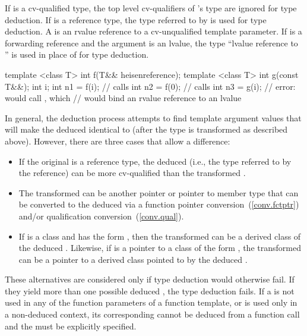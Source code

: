 \pnum
{}%
If
is a cv-qualified type, the top level cv-qualifiers of
's
type are ignored for type deduction.
If
is a reference type, the type
referred to by
is used for type deduction.
A 
is an rvalue reference to a cv-unqualified template parameter.
If  is a forwarding reference and the argument is an
lvalue, the type ``lvalue reference to '' is used in place of  for type
deduction. \enterexample
\begin{codeblock}
template <class T> int f(T&& heisenreference);
template <class T> int g(const T&&);
int i;
int n1 = f(i);                  // calls 
int n2 = f(0);                  // calls 
int n3 = g(i);                  // error: would call , which
                                // would bind an rvalue reference to an lvalue
\end{codeblock}
\exitexample

\pnum
In general, the deduction process attempts to find template argument
values that will make the deduced
identical to
(after
the type
is transformed as described above).
However, there are
three cases that allow a difference:

\begin{itemize}
\item
If the original
is a reference type, the deduced
(i.e.,
the type referred to by the reference) can be more cv-qualified than
the transformed .
\item
The transformed 
can be another pointer or pointer to member type that can be converted
to the deduced
via a function pointer conversion~(\ref{conv.fctptr}) and/or
qualification conversion~(\ref{conv.qual}).

\item
If
is a class and
has the form
,
then
the transformed 
can be a derived class of the
deduced
.
Likewise, if
is a pointer to a class of the form
,
the transformed 
can be a pointer to a
derived class pointed to by the deduced
.
\end{itemize}

\pnum
These alternatives are considered only if type deduction would
otherwise fail.
If they yield more than one possible deduced
,
the type deduction fails.
\enternote
If a
is not used in any of the function parameters of a function template,
or is used only in a non-deduced context, its corresponding
cannot be deduced from a function call and the
must be explicitly specified.
\exitnote

